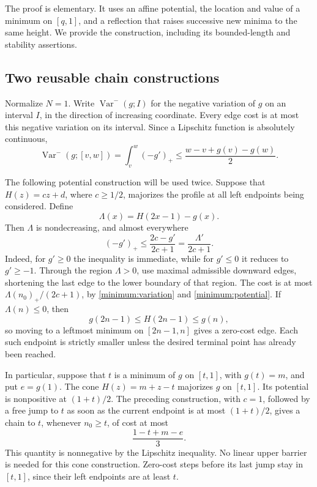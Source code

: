 The proof is elementary. It uses an affine potential, the location and value
of a minimum on \([q,1]\), and a reflection that raises successive new
minima to the same height. We provide the construction, including its
bounded-length and stability assertions.

\subsection{Two reusable chain constructions}
Normalize \(N=1\). Write \(\operatorname{Var}^-(g;I)\) for the negative
variation of \(g\) on an interval \(I\), in the direction of increasing
coordinate. Every edge cost is at most this negative variation on its
interval. Since a Lipschitz function is absolutely continuous,
\begin{equation}\label{minimum:variation}
 \operatorname{Var}^-(g;[v,w])
 =\int_v^w(-g')_+\le\frac{w-v+g(v)-g(w)}2.
\end{equation}

The following potential construction will be used twice. Suppose that
\(H(z)=cz+d\), where \(c\ge1/2\), majorizes the profile at all left
endpoints being considered. Define
\[
 \Lambda(x)=H(2x-1)-g(x).
\]
Then \(\Lambda\) is nondecreasing, and almost everywhere
\begin{equation}\label{minimum:potential}
 (-g')_+\le\frac{2c-g'}{2c+1}=\frac{\Lambda'}{2c+1}.
\end{equation}
Indeed, for \(g'\ge0\) the inequality is immediate, while for
\(g'\le0\) it reduces to \(g'\ge-1\). Through the region
\(\Lambda>0\), use maximal admissible downward edges, shortening the
last edge to the lower boundary of that region. The cost is at most
\(\Lambda(n_0)_+/(2c+1)\), by \eqref{minimum:variation} and
\eqref{minimum:potential}. If \(\Lambda(n)\le0\), then
\[
 g(2n-1)\le H(2n-1)\le g(n),
\]
so moving to a leftmost minimum on \([2n-1,n]\) gives a zero-cost
edge. Each such endpoint is strictly smaller unless the desired terminal
point has already been reached.

In particular, suppose that \(t\) is a minimum of \(g\) on
\([t,1]\), with \(g(t)=m\), and put \(e=g(1)\). The cone
\(H(z)=m+z-t\) majorizes \(g\) on \([t,1]\). Its potential is
nonpositive at \((1+t)/2\). The preceding construction, with \(c=1\),
followed by a free jump to \(t\) as soon as the current endpoint is at
most \((1+t)/2\), gives a chain to \(t\), whenever \(n_0\ge t\),
of cost at most
\begin{equation}\label{minimum:cone}
 \frac{1-t+m-e}{3}.
\end{equation}
This quantity is nonnegative by the Lipschitz inequality. No linear upper
barrier is needed for this cone construction. Zero-cost steps before its
last jump stay in \([t,1]\), since their left endpoints are at least
\(t\).

